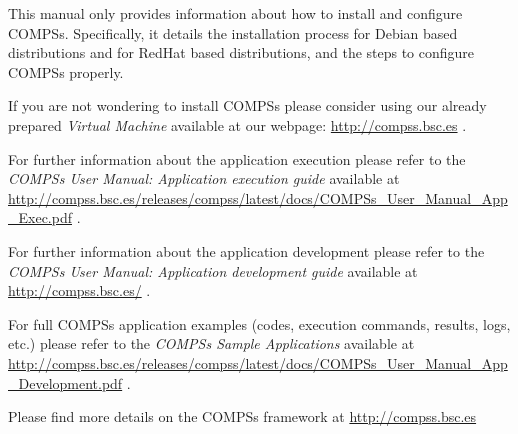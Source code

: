 \documentclass[a4paper,12pt]{article}
\begin{document}
  {
    This manual only provides information about how to install and configure COMPSs. Specifically, it details the installation 
    process for Debian based distributions and for RedHat based distributions, and the steps to configure COMPSs properly.
    \newline
    
    If you are not wondering to install COMPSs please consider using our already prepared \textit{Virtual Machine} available
    at our webpage: \url{http://compss.bsc.es} .
    \newline
    
    For further information about the application execution please refer to the \textit{COMPSs User Manual: Application execution
    guide} available at \url{http://compss.bsc.es/releases/compss/latest/docs/COMPSs_User_Manual_App_Exec.pdf} .
    
    For further information about the application development please refer to the \textit{COMPSs User Manual: Application development
    guide} available at \url{http://compss.bsc.es/} .
    
    For full COMPSs application examples (codes, execution commands, results, logs, etc.) please refer to the \textit{COMPSs Sample 
    Applications} available at \url{http://compss.bsc.es/releases/compss/latest/docs/COMPSs_User_Manual_App_Development.pdf} .
  }
  
  \setcounter{tocdepth}{6}
  \tableofcontents
  \listoffigures
  \listoftables
    
  \newpage

    
  

  
  
  
          
  
  
  
  
  

  
           
  

  
  
  
  
  \newpage

  \vspace*{\fill} 
  \begin{center}
    \large { Please find more details on the COMPSs framework at }
    \huge{\url{http://compss.bsc.es}}
  \end{center}    
  \vspace*{\fill} 
           
\end{document}
